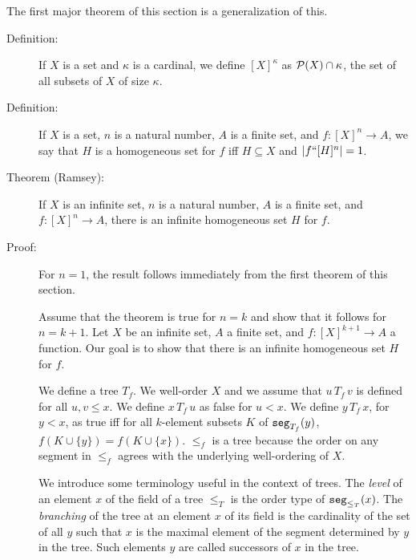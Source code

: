 \documentclass[12pt]{book}
\begin{document}
The first major theorem of this section is a generalization of this.

\begin{description}

\item[Definition:] If $X$ is a set and $\kappa$ is a cardinal, we
define $[X]^{\kappa}$ as ${\cal P}(X) \cap \kappa$, the set of all
subsets of $X$ of size $\kappa$.

\item[Definition:]  If $X$ is a set, $n$ is a natural number, $A$ is a finite set, and $f:[X]^n \rightarrow A$, we say that $H$ is a homogeneous set for $f$ iff $H \subseteq X$ and $|f``[H]^n| = 1$.

\item[Theorem (Ramsey):] If $X$ is an infinite set, $n$ is a natural
number, $A$ is a finite set, and $f:[X]^n \rightarrow A$, there is an
infinite homogeneous set $H$ for $f$.

\item[Proof:] For $n=1$, the result follows immediately from the first
theorem of this section.

Assume that the theorem is true for $n=k$ and show that it follows for
$n=k+1$.  Let $X$ be an infinite set, $A$ a finite set, and
$f:[X]^{k+1}\rightarrow A$ a function.  Our goal is to show that there
is an infinite homogeneous set $H$ for $f$.

We define a tree $T_f$.  We well-order $X$ and we assume that $u\,T_f\,v$
is defined for all $u,v \leq x$.  We define $x\,T_f\,u$ as false for $u<x$.
We define $y \, T_f \,x$, for $y < x$, as true iff for all $k$-element
subsets $K$ of ${\tt seg}_{T_f}(y)$, $f(K\cup \{y\}) = f(K \cup \{x\})$.
$\leq_f$ is a tree because the order on any segment in $\leq_f$  agrees
with the underlying well-ordering of $X$.

We introduce some terminology useful in the context of trees.  The
{\em level\/} of an element $x$ of the field of a tree $\leq_T$ is the
order type of ${\tt seg}_{\leq_T}(x)$.  The {\em branching\/} of the
tree at an element $x$ of its field is the cardinality of the set of
all $y$ such that $x$ is the maximal element of the segment determined
by $y$ in the tree.  Such elements $y$ are called successors of $x$ in
the tree.


\end{description}
\end{document}
